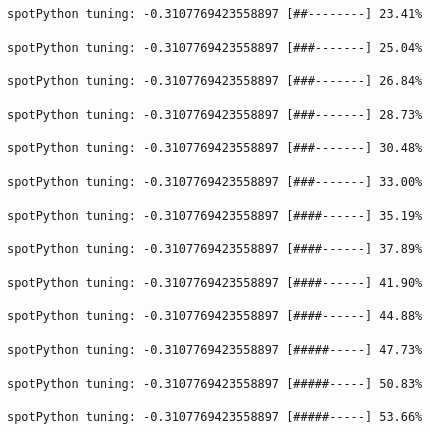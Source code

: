 \documentclass[
  letterpaper,
  DIV=11,
  numbers=noendperiod]{scrreprt}
\begin{document}
\begin{verbatim}
spotPython tuning: -0.3107769423558897 [##--------] 23.41% 
\end{verbatim}

\begin{verbatim}
spotPython tuning: -0.3107769423558897 [###-------] 25.04% 
\end{verbatim}

\begin{verbatim}
spotPython tuning: -0.3107769423558897 [###-------] 26.84% 
\end{verbatim}

\begin{verbatim}
spotPython tuning: -0.3107769423558897 [###-------] 28.73% 
\end{verbatim}

\begin{verbatim}
spotPython tuning: -0.3107769423558897 [###-------] 30.48% 
\end{verbatim}

\begin{verbatim}
spotPython tuning: -0.3107769423558897 [###-------] 33.00% 
\end{verbatim}

\begin{verbatim}
spotPython tuning: -0.3107769423558897 [####------] 35.19% 
\end{verbatim}

\begin{verbatim}
spotPython tuning: -0.3107769423558897 [####------] 37.89% 
\end{verbatim}

\begin{verbatim}
spotPython tuning: -0.3107769423558897 [####------] 41.90% 
\end{verbatim}

\begin{verbatim}
spotPython tuning: -0.3107769423558897 [####------] 44.88% 
\end{verbatim}

\begin{verbatim}
spotPython tuning: -0.3107769423558897 [#####-----] 47.73% 
\end{verbatim}

\begin{verbatim}
spotPython tuning: -0.3107769423558897 [#####-----] 50.83% 
\end{verbatim}

\begin{verbatim}
spotPython tuning: -0.3107769423558897 [#####-----] 53.66% 
\end{verbatim}
\end{document}
